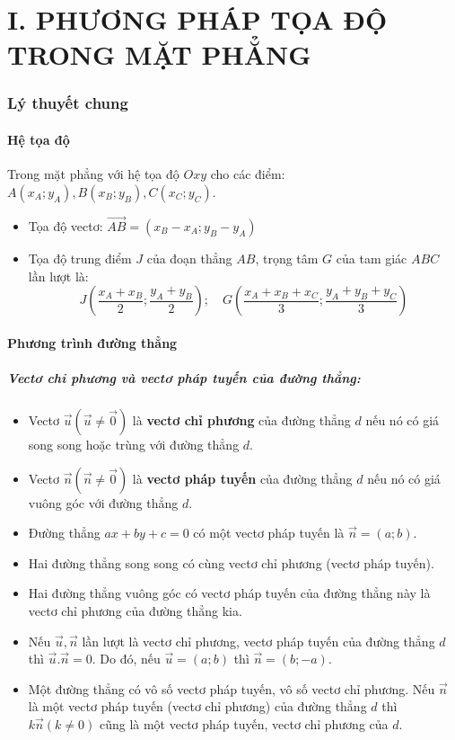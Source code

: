 \part*{I. PHƯƠNG PHÁP TỌA ĐỘ TRONG MẶT PHẲNG}
\section{Lý thuyết chung}
\subsection{Hệ tọa độ}
Trong mặt phẳng với hệ tọa độ $Oxy$ cho các điểm: $A\left(x_A;y_A\right), B\left(x_B;y_B\right), C\left(x_C;y_C\right)$.
\begin{itemize}
\item Tọa độ vectơ: $\overrightarrow{AB} = \left(x_B-x_A;y_B-y_A\right)$
\item Tọa độ trung điểm $J$ của đoạn thẳng $AB$, trọng tâm $G$ của tam giác $ABC$ lần lượt là: 
$$J\left( \dfrac{x_A+x_B}{2}; \dfrac{y_A+y_B}{2}\right); \quad G\left( \dfrac{x_A+x_B+x_C}{3}; \dfrac{y_A+y_B+y_C}{3}\right)$$
\end{itemize}
\subsection{Phương trình đường thẳng}
\subsubsection{ Vectơ chỉ phương và vectơ pháp tuyến của đường thẳng:}
\begin{itemize}
\item Vectơ $\overrightarrow u (\overrightarrow u \neq \overrightarrow 0) $ là \textbf{vectơ chỉ phương} của đường thẳng $d$ nếu nó có giá song song hoặc trùng với đường thẳng $d$.
\item Vectơ $\overrightarrow n (\overrightarrow n \neq \overrightarrow 0) $ là \textbf{vectơ pháp tuyến} của đường thẳng $d$ nếu nó có giá vuông góc với đường thẳng $d$.
\item Đường thẳng $ax + by + c = 0$ có một vectơ pháp tuyến là $\overrightarrow n = (a; b)$.
\item Hai đường thẳng song song có cùng vectơ chỉ phương (vectơ pháp tuyến).
\item Hai đường thẳng vuông góc có vectơ pháp tuyến của đường thẳng này là vectơ chỉ phương của đường thẳng kia.
\item Nếu $\overrightarrow u, \overrightarrow n$ lần lượt là vectơ chỉ phương, vectơ pháp tuyến của đường thẳng $d$ thì $\overrightarrow u. \overrightarrow n = 0$. Do đó, nếu $\overrightarrow u = (a;b)$ thì $\overrightarrow n = (b; -a)$.
\item Một đường thẳng có vô số vectơ pháp tuyến, vô số vectơ chỉ phương. Nếu $\overrightarrow n$ là một vectơ pháp tuyến (vectơ chỉ phương) của đường thẳng $d$ thì $k\overrightarrow n (k \neq 0)$ cũng là một vectơ pháp tuyến, vectơ chỉ phương của $d$.
\end{itemize} 
